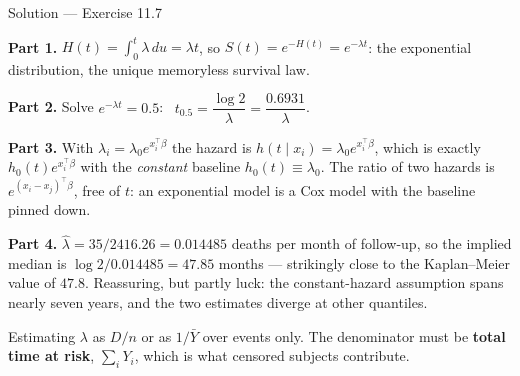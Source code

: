 \documentclass[aspectratio=169,11pt]{beamer}
\begin{document}
\begin{frame}{Solution --- Exercise 11.7}
\begin{solutionbox}
  \scriptsize
  \textbf{Part 1.} $H(t)=\int_0^t\lambda\,du=\lambda t$, so
  $S(t)=e^{-H(t)}=e^{-\lambda t}$: the exponential distribution, the unique
  memoryless survival law.

  \medskip
  \textbf{Part 2.} Solve $e^{-\lambda t}=0.5$: \
  $t_{0.5}=\dfrac{\log 2}{\lambda}=\dfrac{0.6931}{\lambda}$.

  \medskip
  \textbf{Part 3.} With $\lambda_i=\lambda_0e^{x_i^\top\beta}$ the hazard is
  $h(t\mid x_i)=\lambda_0e^{x_i^\top\beta}$, which is exactly
  $h_0(t)e^{x_i^\top\beta}$ with the \emph{constant} baseline $h_0(t)\equiv\lambda_0$.
  The ratio of two hazards is $e^{(x_i-x_j)^\top\beta}$, free of $t$: an exponential model
  is a Cox model with the baseline pinned down.

  \medskip
  \textbf{Part 4.} $\hat\lambda=35/2416.26=0.014485$ deaths per month of follow-up, so the
  implied median is $\log 2/0.014485=47.85$ months --- strikingly close to the
  Kaplan--Meier value of $47.8$. Reassuring, but partly luck: the constant-hazard
  assumption spans nearly seven years, and the two estimates diverge at other quantiles.
\end{solutionbox}
\begin{mistake}
  \scriptsize
  Estimating $\lambda$ as $D/n$ or as $1/\bar Y$ over events only. The denominator
  must be \textbf{total time at risk}, $\sum_i Y_i$, which is what censored subjects
  contribute.
\end{mistake}
\end{frame}
\end{document}
